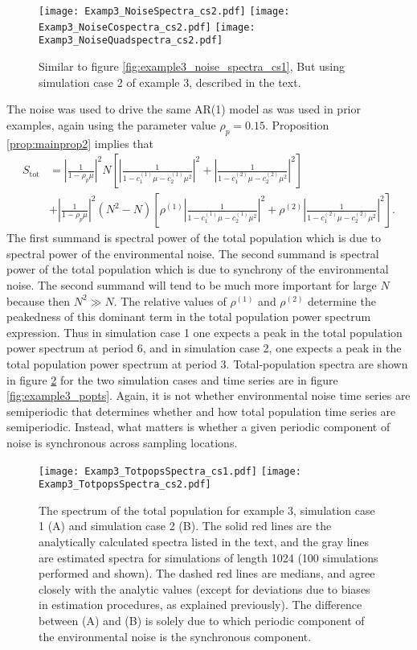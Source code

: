 \documentclass[letterpaper,11pt]{article}
\begin{document}
\begin{figure}
\texttt{[image: Examp3\_NoiseSpectra\_cs2.pdf]}
\texttt{[image: Examp3\_NoiseCospectra\_cs2.pdf]}
\texttt{[image: Examp3\_NoiseQuadspectra\_cs2.pdf]}
\caption{Similar to figure \ref{fig:example3_noise_spectra_cs1}, But using simulation case 2 of example 3, described in the text.}\label{fig:example3_noise_spectra_cs2}
\end{figure}

The noise was used to drive the same AR(1) model as was used in prior examples,
again using the parameter value $\rho_p=0.15$. Proposition \ref{prop:mainprop2}
implies that
\begin{align}
S_{\text{tot}} &= \left| \frac{1}{1-\rho_p \mu} \right|^2
N\left[ \left| \frac{1}{1-c_1^{(1)}\mu-c_2^{(1)}\mu^2} \right|^2 
+ \left| \frac{1}{1-c_1^{(2)}\mu-c_2^{(2)}\mu^2} \right|^2\right] \\
&+ \left| \frac{1}{1-\rho_p \mu} \right|^2
(N^2-N)\left[ \rho^{(1)} \left| \frac{1}{1-c_1^{(1)}\mu-c_2^{(1)}\mu^2} \right|^2+ \rho^{(2)}\left| \frac{1}{1-c_1^{(2)}\mu-c_2^{(2)}\mu^2} \right|^2 \right].
\end{align}
The first summand is spectral power of the total population which is due to spectral power of the  environmental noise. The second summand is spectral power of the total population which is due to  synchrony of the environmental noise. The second summand will tend to be much more important  for large $N$ because then $N^2 \gg N$. The relative values 
of $\rho^{(1)}$ and $\rho^{(2)}$ determine the peakedness of this dominant
term in the total population power spectrum expression. Thus in simulation case 1 
one expects a peak in the total population power spectrum at period 6,
and in simulation case 2, one expects a peak in the total population power spectrum 
at period 3. Total-population spectra are shown in figure \ref{fig:example3_totpopspec} for the two simulation cases and time series are in figure \ref{fig:example3_popts}. Again, it is not whether environmental noise time series are semiperiodic that determines whether and how total population time series are semiperiodic. Instead, what matters is  whether a given periodic component of noise is synchronous across sampling locations.

\begin{figure}
\texttt{[image: Examp3\_TotpopsSpectra\_cs1.pdf]}
\texttt{[image: Examp3\_TotpopsSpectra\_cs2.pdf]}
\caption{The spectrum of the total population for example 3, simulation case 1 (A) and simulation case 2 (B). The solid red lines are the analytically calculated spectra listed in the text, and the gray lines are estimated spectra for simulations of length 1024 (100 simulations performed and shown). The dashed red lines are medians, and agree closely with the analytic values (except for deviations due to biases in estimation procedures, as explained previously). The difference between (A) and (B) is solely due to which periodic component of the environmental noise is the synchronous component.}\label{fig:example3_totpopspec}
\end{figure}
\end{document}
